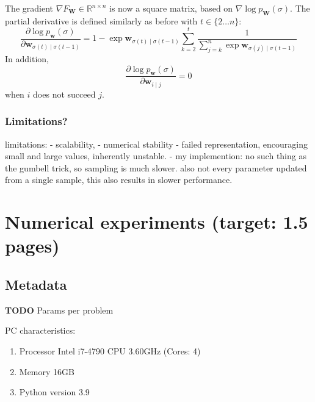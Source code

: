 \documentclass[a4paper,10pt]{article}
\newcommand{\matr}[1]{\mathbf{#1}}
\newcommand{\ReplaceMe}[1]{{\color{blue}#1}}
\newcommand{\RemoveMe}[1]{{\color{purple}#1}}
\begin{document}
	The gradient $\nabla F_\mathbf{\matr{W}} \in \mathbb{R}^{n\times n}$ is now a square matrix, based on $\nabla \log p_\matr{W}(\sigma)$. The partial derivative is defined similarly as before with $t \in \{ 2 \dots n \}$:
	$$
	\frac{\partial \log p_\mathbf{w}(\sigma)}{\partial \matr{w}_{\sigma(t) \mid \sigma(t-1)}} = 1-\exp \matr{w}_{\sigma(t) \mid \sigma(t - 1)} \sum_{k=2}^t \frac{1}{\sum_{j=k}^n \exp \matr{w}_{\sigma(j) \mid \sigma(t - 1)}}
	$$
	In addition,
	$$
	\frac{\partial \log p_\mathbf{w}(\sigma)}{\partial \matr{w}_{i \mid j}} = 0
	$$
	when $i$ does not succeed $j$.
	
	\subsubsection{Limitations?}
	
	limitations:
	- scalability,
	- numerical stability
	- failed representation, encouraging small and large values, inherently unstable.	
	- my implemention: no such thing as the gumbell trick, so sampling is much slower. also not every parameter updated from a single sample, this also results in slower performance.
	

\section{Numerical experiments (target: 1.5 pages)}

\subsection{Metadata}

	\textbf{TODO} Params per problem

	PC characteristics:
	\begin{enumerate}
		\item Processor Intel i7-4790 CPU \@ 3.60GHz (Cores: 4)
		\item Memory 16GB
		\item Python version 3.9
	\end{enumerate}
	
\end{document}
